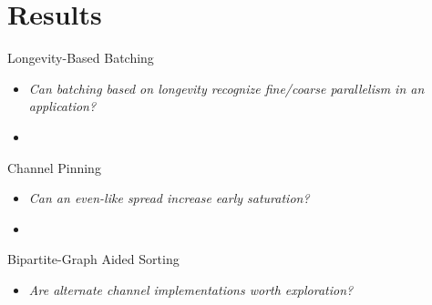 \section{Results}

\begin{slide}
    Longevity-Based Batching
     \begin{itemize}
         \item {\sl Can batching based on longevity recognize fine/coarse parallelism in an application?}
        \item[] ~
    \end{itemize}

    Channel Pinning 
    \begin{itemize}
        \item {\sl Can an {\em even}-like spread increase early saturation?}
        \item[] ~
    \end{itemize}

    Bipartite-Graph Aided Sorting
    \begin{itemize}
        \item {\sl Are alternate channel implementations worth exploration?}
    \end{itemize}

\end{slide}

